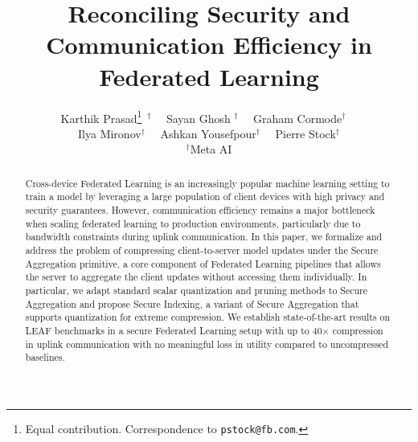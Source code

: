 \documentclass[11pt]{article}
\title{Reconciling Security and Communication Efficiency in Federated Learning}
\author{
Karthik Prasad\thanks{Equal contribution. Correspondence to \texttt{pstock@fb.com}.} $^{~\dagger}$~~ Sayan Ghosh\footnotemark[1]$^{~~\dagger}$~~ Graham Cormode$^\dagger$~~ \\ {Ilya Mironov$^\dagger$~~ Ashkan Yousefpour$^\dagger$~~ Pierre Stock$^\dagger$} \\ $^\dagger$Meta AI
}
\newcommand{\karthik}[1]{{\color{blue}Karthik: #1}}
\begin{document}
\maketitle 
\begin{abstract}
Cross-device Federated Learning is an increasingly popular machine learning setting to train a model by leveraging 
a large population of client devices with high privacy and security guarantees. 
However, 
communication efficiency remains a major bottleneck when scaling federated learning to production environments, particularly due to bandwidth constraints during uplink communication.
In this paper, we formalize and address the problem of compressing client-to-server model updates
under the Secure Aggregation primitive, a core component of Federated Learning pipelines that allows the server to aggregate the client updates without accessing them individually. 
In particular, we adapt standard scalar quantization and pruning methods
to Secure Aggregation and propose Secure Indexing, a variant of Secure Aggregation that supports quantization for extreme compression.
We establish state-of-the-art results on LEAF benchmarks in a secure Federated Learning setup with up to 40$\times$ compression in uplink communication 
with no meaningful loss in utility compared to uncompressed baselines.
\end{abstract}

















\end{document}
